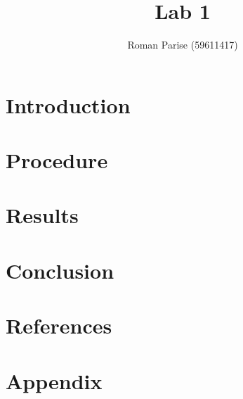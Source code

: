 \documentclass[a4paper,titlepage,10pt]{article}
\title{Lab 1}
\author{Roman Parise (59611417)}
\begin{document}
\maketitle

\section{Introduction}

\section{Procedure}

\section{Results}


\section{Conclusion}


\section{References}

\section{Appendix}

\end{document}
